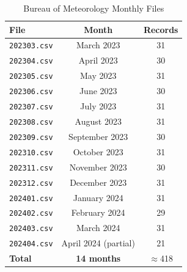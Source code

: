 \documentclass[12pt,a4paper]{article}
\begin{document}
\begin{table}[H]
\centering
\caption{Bureau of Meteorology Monthly Files}
\begin{tabular}{lcc}
\toprule
File & Month & Records \\
\midrule
\texttt{202303.csv} & March 2023 & 31 \\
\texttt{202304.csv} & April 2023 & 30 \\
\texttt{202305.csv} & May 2023 & 31 \\
\texttt{202306.csv} & June 2023 & 30 \\
\texttt{202307.csv} & July 2023 & 31 \\
\texttt{202308.csv} & August 2023 & 31 \\
\texttt{202309.csv} & September 2023 & 30 \\
\texttt{202310.csv} & October 2023 & 31 \\
\texttt{202311.csv} & November 2023 & 30 \\
\texttt{202312.csv} & December 2023 & 31 \\
\texttt{202401.csv} & January 2024 & 31 \\
\texttt{202402.csv} & February 2024 & 29 \\
\texttt{202403.csv} & March 2024 & 31 \\
\texttt{202404.csv} & April 2024 (partial) & 21 \\
\midrule
\textbf{Total} & \textbf{14 months} & ${\approx}$418 \\
\bottomrule
\end{tabular}
\end{table}
\end{document}
